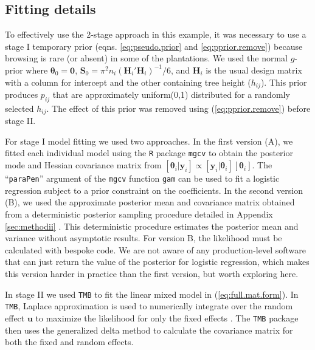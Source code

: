 \documentclass[12pt]{article}
\newcommand{\by}{\mathbf{y}}
\newcommand{\bt}{\boldsymbol{\theta}}
\newcommand{\bS}{\mathbf{S}}
\newcommand{\bu}{\mathbf{u}}
\begin{document}
\subsection{Fitting details}

To effectively use the 2-stage approach in this example, it was necessary to use a stage I temporary prior (eqns. \ref{eq:pseudo.prior} and \ref{eq:pprior.remove}) because browsing is rare (or absent) in some of the plantations. We used the normal $g$-prior \citep{hanson2014informative} where $\bt_0 = \mathbf{0}$, $\bS_0 = \pi^2 n_i (\mathbf{H}_i'\mathbf{H}_i)^{-1}/6$, and $\mathbf{H}_i$ is the usual design matrix with a column for intercept and the other containing tree height ($h_{ij}$). This prior produces $p_{ij}$ that are approximately uniform(0,1) distributed for a randomly selected  $h_{ij}$. The effect of this prior was removed using (\ref{eq:pprior.remove}) before stage II.

For stage I model fitting we used two approaches. In the first version (A), we fitted each individual model using the {\tt R} package {\tt mgcv} \citep{wood2011fast} to obtain the posterior mode and Hessian covariance matrix from $[\bt_i|\by_i] \propto [\by_i|\bt_i][\bt_i]$. The ``{\tt paraPen}'' argument of the {\tt mgcv} function {\tt gam} can be used to fit a logistic regression subject to a prior constraint on the coefficients. In the second version (B), we used the approximate posterior mean and covariance matrix obtained from a deterministic posterior sampling procedure detailed in Appendix \ref{sec:methodii} \citep{johnson2011bayesian,Rue:2009uq}. This deterministic procedure estimates the posterior mean and variance without asymptotic results. For version B, the likelihood must be calculated with bespoke code. We are not aware of any production-level software that can just return the value of the posterior for logistic regression, which makes this version harder in practice than the first version, but worth exploring here.  

In stage II we used {\tt TMB} to fit the linear mixed model in (\ref{eq:full.mat.form}). In {\tt TMB}, Laplace approximation is used to numerically integrate over the random effect $\bu$ to maximize the likelihood for only the fixed effects \citep{kristensen2016tmb}. The {\tt TMB} package then uses the generalized delta method to calculate the covariance matrix for both the fixed and random effects. 
\end{document}
